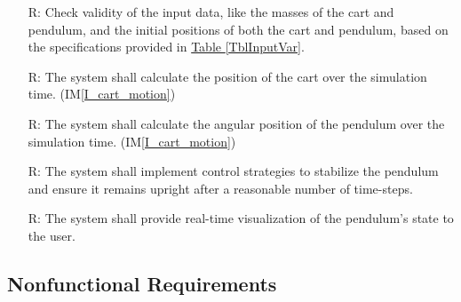 \documentclass[12pt]{article}
\newcommand{\iref}[1]{IM\ref{#1}}
\newcounter{reqnum} %
\begin{document}
\noindent \begin{itemize}

\item[R\refstepcounter{reqnum}\thereqnum \label{R_Inputs}:]
    Check validity of the input data, like the masses of the cart and pendulum,
    and the initial positions of both the cart and pendulum,
    based on the specifications provided in \hyperref[TblInputVar]{Table \ref*{TblInputVar}}.

\item[R\refstepcounter{reqnum}\thereqnum \label{R_cart_position}:]
    The system shall calculate the position of
    the cart over the simulation time. (\iref{I_cart_motion})

\item[R\refstepcounter{reqnum}\thereqnum \label{R_pendulum_position}:]
    The system shall calculate the angular position
    of the pendulum over the simulation time. (\iref{I_cart_motion})

\item[R\refstepcounter{reqnum}\thereqnum \label{R_control_system}:]
    The system shall implement control strategies to stabilize 
    the pendulum and ensure it remains upright after 
    a reasonable number of time-steps.

\item[R\refstepcounter{reqnum}\thereqnum \label{R_Output}:]
    The system shall provide real-time visualization of the pendulum's state to the user.

\end{itemize}


\subsection{Nonfunctional Requirements}
\end{document}
